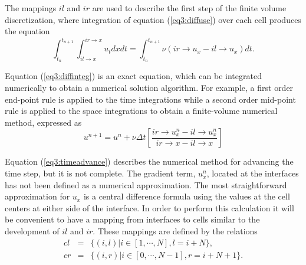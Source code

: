 The mappings $il$ and $ir$ are used to describe the first
step of the finite volume discretization, where integration of
equation (\ref{eq3:diffuse}) over each cell produces the equation
\begin{equation}
\int_{t_n}^{t_{n+1}} \int_{il \rightarrow x}^{ir \rightarrow x} u_t dx
dt = \int_{t_n}^{t_{n+1}} \nu(ir \rightarrow u_x - il \rightarrow
u_x) dt.
\label{eq3:diffinteg}
\end{equation}

Equation (\ref{eq3:diffinteg}) is an exact equation, which can be
integrated numerically to obtain a numerical solution algorithm.
For example, a first order end-point rule is applied to the time
integrations while a second order mid-point rule is applied to the space
integrations to obtain a finite-volume numerical method, expressed as
\begin{equation}
u^{n+1} = u^n + \nu \Delta t
\left[ \frac{ir \rightarrow u^n_x - il \rightarrow u^n_x}
          {ir\rightarrow x - il\rightarrow x}\right]
\label{eq3:timeadvance}
\end{equation}

Equation (\ref{eq3:timeadvance}) describes the numerical method for
advancing the time step, but it is not complete.  The gradient term,
$u^n_x$, located at the interfaces has not been defined as a numerical
approximation.  The most straightforward approximation for $u_x$ is a
central difference formula using the values at the cell centers at
either side of the interface.  In order to perform this calculation it
will be convenient to have a mapping from interfaces to cells similar to
the development of $il$ and $ir$.  These mappings are defined by
the relations
\begin{equation}
\begin{array}{rcl}
cl & = & \lbrace (i,l) | i \in [1, \cdots, N], l = i+N \rbrace,\\
cr & = & \lbrace (i,r) | i \in [0, \cdots, N-1], r = i+N+1 \rbrace.\\
\end{array}
\label{eq3:facemaps}
\end{equation}

